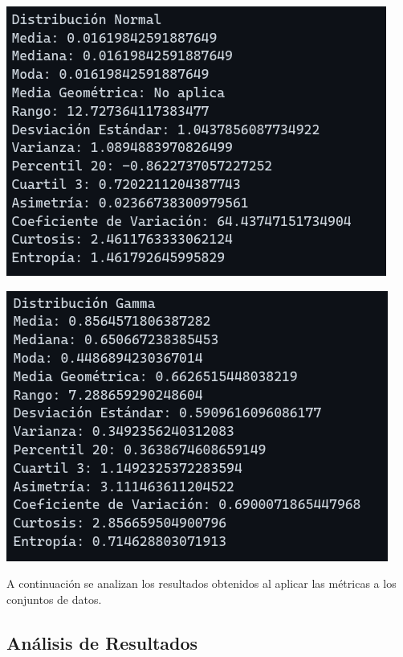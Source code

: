 \documentclass[11pt]{article} %
\begin{document}
	\begin{multicols}{2}
		\begin{minipage}{\linewidth}
			\centering
			\includegraphics[width=0.9\linewidth]{resultadosNormal.png}
			\label{fig:resultados-normal}
		\end{minipage}
		\vfill\columnbreak
		\begin{minipage}{\linewidth}
			\centering
			\includegraphics[width=0.9\linewidth]{resultadosGamma.png}
			\label{fig:resultados-gamma}
		\end{minipage}
	\end{multicols}
	
	A continuación se analizan los resultados obtenidos al aplicar las métricas a los conjuntos de datos.
	
	\subsection{Análisis de Resultados}
	
\end{document}
